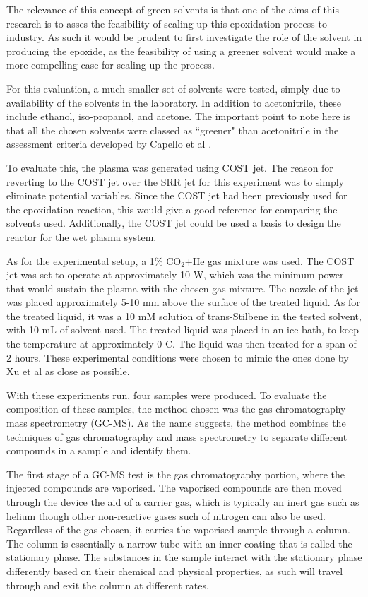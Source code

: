 The relevance of this concept of green solvents is that one of the aims of this research is to asses the feasibility of scaling up this epoxidation process to industry. As such it would be prudent to first investigate the role of the solvent in producing the epoxide, as the feasibility of using a greener solvent would make a more compelling case for scaling up the process. 

For this evaluation, a much smaller set of solvents were tested, simply due to availability of the solvents in the laboratory. In addition to acetonitrile, these include ethanol, iso-propanol, and acetone. The important point to note here is that all the chosen solvents were classed as ``greener" than acetonitrile in the assessment criteria developed by Capello et al \cite{Capello2007}. 

To evaluate this, the plasma was generated using COST jet. The reason for reverting to the COST jet over the SRR jet for this experiment was to simply eliminate potential variables. Since the COST jet had been previously used for the epoxidation reaction, this would give a good reference for comparing the solvents used. Additionally, the COST jet could be used a basis to design the reactor for the wet plasma system.

As for the experimental setup, a 1\% CO$_2$+He gas mixture was used. The COST jet was set to operate at approximately 10 W, which was the minimum power that would sustain the plasma with the chosen gas mixture. The nozzle of the jet was placed approximately 5-10 mm above the surface of the treated liquid. As for the treated liquid, it was a 10 mM solution of trans-Stilbene in the tested solvent, with 10 mL of solvent used. The treated liquid was placed in an ice bath, to keep the temperature at approximately 0 C. The liquid was then treated for a span of 2 hours. These experimental conditions were chosen to mimic the ones done by Xu et al \cite{Xu2021} as close as possible.

With these experiments run, four samples were produced. To evaluate the composition of these samples, the method chosen was the gas chromatography–mass spectrometry (GC-MS). As the name suggests, the method combines the techniques of gas chromatography and mass spectrometry to separate different compounds in a sample and identify them. 

The first stage of a GC-MS test is the gas chromatography portion, where the injected compounds are vaporised. The vaporised compounds are then moved through the device the aid of a carrier gas, which is typically an inert gas such as helium though other non-reactive gases such of nitrogen can also be used. Regardless of the gas chosen, it carries the vaporised sample through a column. The column is essentially a narrow tube with an inner coating that is called the stationary phase. The substances in the sample interact with the stationary phase differently based on their chemical and physical properties, as such will travel through and exit the column at different rates.

